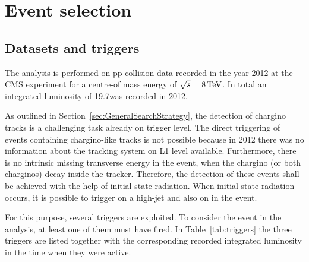 \chapter{Event selection}
\label{sec:EventSelection}
\section{Datasets and triggers}
\label{sec:DatasetsAndTriggers}

The analysis is performed on pp collision data recorded in the year 2012 at the CMS experiment for a centre-of mass energy of $\sqrt{s}=8\,\text{Te}\kern-0.06667em\text{V}$.
In total an integrated luminosity of 19.7\fbinv was recorded in 2012.

As outlined in Section~\ref{sec:GeneralSearchStrategy}, the detection of chargino tracks is a challenging task already on trigger level.
The direct triggering of events containing chargino-like tracks is not possible because in 2012 there was no information about the tracking system on L1 level available.
Furthermore, there is no intrinsic missing transverse energy in the event, when the chargino (or both charginos) decay inside the tracker.
Therefore, the detection of these events shall be achieved with the help of initial state radiation.
When initial state radiation occurs, it is possible to trigger on a high-\pt jet and also on \met in the event.

For this purpose, several triggers are exploited.
To consider the event in the analysis, at least one of them must have fired.
In Table~\ref{tab:triggers} the three triggers are listed together with the corresponding recorded integrated luminosity in the time when they were active.
\renewcommand{\arraystretch}{1.5}
\begin{table}[!hbt]
\centering
\caption{\met and \met+ jet triggers used in the analysis together with the corresponding recorded integrated luminosity in the time when they were in place.}
\label{tab:triggers}
\end{table}  

